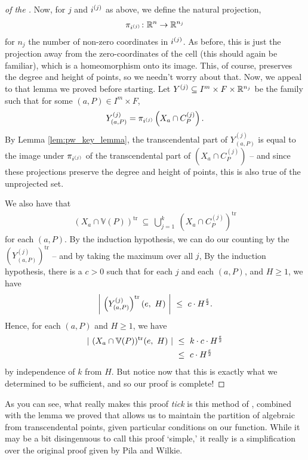 \begin{proof}[of the \pwT]
    Now, for $j$ and $i^{(j)}$ as above, we define the natural projection,
    \begin{align*}
      \pi_{i^{(j)}} \colon \mathbb{R}^n \to \mathbb{R}^{n_j}
    \end{align*}
    for $n_j$ the number of non-zero coordinates in $i^{(j)}$. As before, this is just the projection away from the zero-coordinates of the cell (this should again be familiar), which is a homeomorphism onto its image. This, of course, preserves the degree and height of points, so we needn't worry about that. Now, we appeal to that lemma we proved before starting. Let $Y^{(j)} \subseteq I^m \times F \times \mathbb{R}^{n_j}$ be the  family such that for some $(a, P) \in I^m \times F$,
    \begin{align*}
      Y^{(j)}_{(a, P)} = \pi_{i^{(j)}} \left( X_a \cap C_{P}^{(j)} \right).
    \end{align*}
    By Lemma \ref{lem:pw_key_lemma}, the transcendental part of $Y^{(j)}_{(a, P)}$ is equal to the image under $\pi_{i^{(j)}}$ of the transcendental part of $\left( X_a \cap C_{P}^{(j)} \right)$ -- and since these projections preserve the degree and height of points, this is also true of the unprojected set.
    
    We also have that 
    \begin{align*}
      (X_a \cap \mathbb{V}(P))^{\textrm{tr}} \ \subseteq \ \bigcup_{j=1}^{k} \ (X_a \cap C_P^{(j)})^{\textrm{tr}}
    \end{align*}
    for each $(a, P)$. By the induction hypothesis, we can do our counting by the $(Y_{(a, P)}^{(j)})^{\textrm{tr}}$ -- and by taking the maximum over all $j$, 
    By the induction hypothesis, there is a $c > 0$ such that for each $j$ and each $(a, P)$, and $H \geq 1$, we have
    \begin{align*}
      \left\vert \ \left( Y^{(j)}_{(a, P)} \right)^{\textrm{tr}} (e, \ H) \ \right\vert \ \leq \ c \cdot H^{\frac{\eps}{2}}.
    \end{align*}
    Hence, for each $(a, P)$ and $H \geq 1$, we have
    \begin{align*}
      \card{ \  (X_a \cap \mathbb{V}(P))^{\textrm{tr}} (e, \ H) \ } \ &\leq \ k \cdot c \cdot H^{\frac{\eps}{2}} \\
                                                                      &\leq \ c \cdot H^{\frac{\eps}{2}}
    \end{align*} 
    by independence of $k$ from $H$. But notice now that this is exactly what we determined to be sufficient, and so our proof is complete!
    \smartqed
\end{proof}

As you can see, what really makes this proof \emph{tick} is this method of \sacd, combined with the lemma we proved that allows us to maintain the partition of algebraic from transcendental points, given particular conditions on our function. While it may be a bit disingenuous to call this proof `simple,' it really is a simplification over the original proof given by Pila and Wilkie.